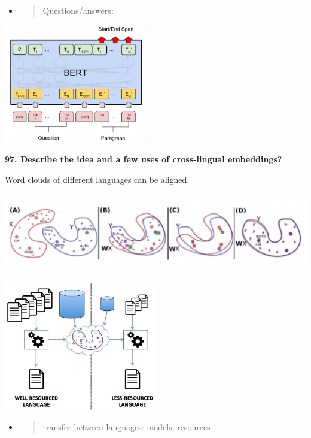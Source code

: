 \begin{itemize}
\item
  \begin{quote}
  Questions/answers:
  \end{quote}
\end{itemize}

\includegraphics[width=2.44427in,height=2.04325in]{media/image37.png}

\textbf{97. Describe the idea and a few uses of cross-lingual
embeddings?}

Word clouds of different languages can be aligned.

\includegraphics[width=6.26772in,height=1.34722in]{media/image22.png}

\includegraphics[width=2.66146in,height=2.2209in]{media/image27.png}

\begin{itemize}
\item
  \begin{quote}
  transfer between languages: models, resources
  \end{quote}
\end{itemize}

